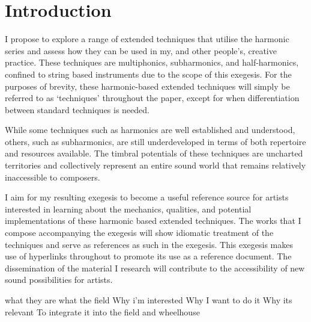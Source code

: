 \section{Introduction}


\doublespace{}

I propose to explore a range of extended techniques that utilise the harmonic series and assess how they can be used in my, and other people's, creative practice. 
These techniques are multiphonics, subharmonics, and half-harmonics, confined to string based instruments due to the scope of this exegesis.
For the purposes of brevity, these harmonic-based extended techniques will simply be referred to as `techniques' throughout the paper, except for when differentiation between standard techniques is needed.

While some techniques such as harmonics are well established and understood, others, such as subharmonics, are still underdeveloped in terms of both repertoire and resources available. 
The timbral potentials of these techniques are uncharted territories and collectively represent an entire sound world that remains relatively inaccessible to composers.


I aim for my resulting exegesis to become a useful reference source for artists interested in learning about the mechanics, qualities, and potential implementations of these harmonic based extended techniques. 
The works that I compose accompanying the exegesis will show idiomatic treatment of the techniques and serve as references as such in the exegesis.
This exegesis makes use of hyperlinks throughout to promote its use as a reference document. 
The dissemination of the material I research will contribute to the accessibility of new sound possibilities for artists.

what they are
what the field
Why i'm interested
Why I want to do it
Why its relevant
To integrate it into the field and wheelhouse

